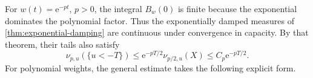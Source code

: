 For $w(t)=\mathrm{e}^{-pt}$, $p>0$, the integral $B_w(0)$ is finite because the exponential dominates the polynomial factor. Thus the exponentially damped measures of \cref{thm:exponential-damping} are continuous under convergence in capacity. By that theorem, their tails also satisfy
\[
 \nu_{p,u}(\{u<-T\})
 \leq\mathrm{e}^{-pT/2}\nu_{p/2,u}(X)
 \leq C_p\mathrm{e}^{-pT/2}.
\]
For polynomial weights, the general estimate takes the following explicit form.
